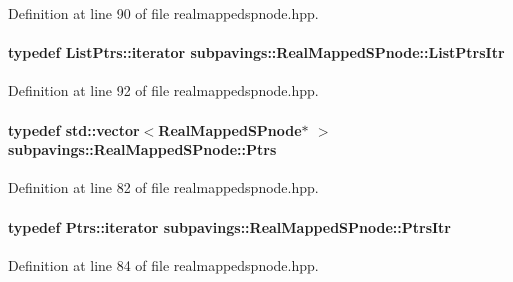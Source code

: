 \-Definition at line 90 of file realmappedspnode.\-hpp.

\hypertarget{classsubpavings_1_1RealMappedSPnode_ad10e24d2efdb436ae6f65306c8ff736e}{
\paragraph[{\-List\-Ptrs\-Itr}]{\setlength{\rightskip}{0pt plus 5cm}typedef \-List\-Ptrs\-::iterator {\bf subpavings\-::\-Real\-Mapped\-S\-Pnode\-::\-List\-Ptrs\-Itr}}}\label{classsubpavings_1_1RealMappedSPnode_ad10e24d2efdb436ae6f65306c8ff736e}


\-Definition at line 92 of file realmappedspnode.\-hpp.

\hypertarget{classsubpavings_1_1RealMappedSPnode_a9591975c77c7e7da92bbdcdf62a74d1a}{
\paragraph[{\-Ptrs}]{\setlength{\rightskip}{0pt plus 5cm}typedef std\-::vector$<${\bf \-Real\-Mapped\-S\-Pnode}$\ast$ $>$ {\bf subpavings\-::\-Real\-Mapped\-S\-Pnode\-::\-Ptrs}}}\label{classsubpavings_1_1RealMappedSPnode_a9591975c77c7e7da92bbdcdf62a74d1a}


\-Definition at line 82 of file realmappedspnode.\-hpp.

\hypertarget{classsubpavings_1_1RealMappedSPnode_a8414841542df48678ae521df3ae92800}{
\paragraph[{\-Ptrs\-Itr}]{\setlength{\rightskip}{0pt plus 5cm}typedef \-Ptrs\-::iterator {\bf subpavings\-::\-Real\-Mapped\-S\-Pnode\-::\-Ptrs\-Itr}}}\label{classsubpavings_1_1RealMappedSPnode_a8414841542df48678ae521df3ae92800}


\-Definition at line 84 of file realmappedspnode.\-hpp.



